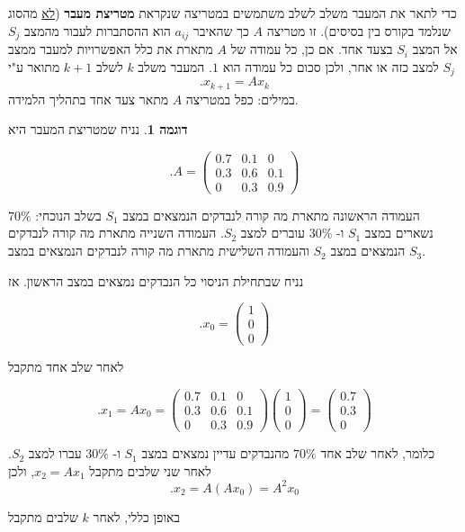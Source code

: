 \documentclass[12pt]{report}
\theoremstyle{plain}
\theoremstyle{definition}
\newtheorem{example}{דוגמה}[chapter]
\newcommand{\0}{\mathbf{0}}
\begin{document}
כדי לתאר את המעבר משלב לשלב משתמשים במטריצה שנקראת
\textbf{מטריצת מעבר}
(\underline{לא}
מהסוג שנלמד בקורס בין בסיסים). זו מטריצה
$A$
כך שהאיבר
$a_{ij}$
הוא ההסתברות לעבור מהמצב
$S_j$
אל המצב
$S_i$
בצעד אחד. אם כן, כל עמודה של
$A$
מתארת את כלל האפשרויות למעבר ממצב
$S_j$
למצב כזה או אחר,
ולכן סכום כל עמודה הוא
$1$.
המעבר משלב
$k$
לשלב
$k+1$
מתואר ע"י
$$
.x_{k+1}=A x_k
$$
במילים: כפל במטריצה
$A$
מתאר צעד אחד בתהליך הלמידה.

\begin{example}
נניח שמטריצת המעבר היא

$$
.A=
\begin{pmatrix}
0.7 & 0.1 & 0 \\
0.3 & 0.6 & 0.1 \\
0 & 0.3 & 0.9
\end{pmatrix}
$$

העמודה הראשונה מתארת מה קורה לנבדקים הנמצאים במצב
$S_1$
בשלב הנוכחי:
$70\%$
נשארים במצב
$S_1$
ו-
$30\%$
עוברים למצב
$S_2$.
העמודה השנייה מתארת מה קורה לנבדקים הנמצאים במצב
$S_2$
והעמודה השלישית מתארת מה קורה לנבדקים הנמצאים במצב
$S_3$.

נניח שבתחילת הניסוי כל הנבדקים נמצאים במצב הראשון. אז

$$
.x_0=
\begin{pmatrix}
1\\
0\\
0
\end{pmatrix}
$$

לאחר שלב אחד מתקבל

$$
.x_1=A x_0
=
\begin{pmatrix}
0.7 & 0.1 & 0 \\
0.3 & 0.6 & 0.1 \\
0 & 0.3 & 0.9
\end{pmatrix}
\begin{pmatrix}
1\\
0\\
0
\end{pmatrix}
=
\begin{pmatrix}
0.7\\
0.3\\
0
\end{pmatrix}
$$

כלומר, לאחר שלב אחד
$70\%$
מהנבדקים עדיין נמצאים במצב
$S_1$
ו-
$30\%$
עברו למצב
$S_2$.
לאחר שני שלבים מתקבל
$x_2=A x_1$,
ולכן
$$
.x_2=A(Ax_0)=A^2x_0
$$

\end{example}

באופן כללי, לאחר
$k$
שלבים מתקבל
\end{document}
